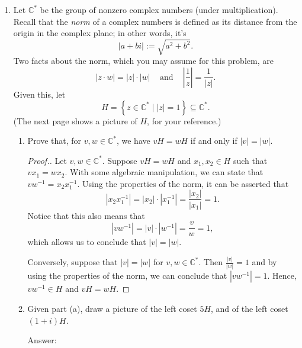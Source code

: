 \documentclass[11pt,twoside]{article}
\begin{document}
\begin{enumerate}
\vspace{0.5cm}
 
 \item Let $\mathbb{C}^*$ be the group of nonzero complex numbers (under multiplication).  Recall that the {\it norm} of a complex numbers is defined as its distance from the origin in the complex plane; in other words, it's
 \[|a+bi| := \sqrt{a^2 + b^2}.\]
 Two facts about the norm, which you may assume for this problem, are
 \[|z \cdot w| = |z| \cdot |w| \;\;\; \text{ and } \;\;\; \left| \frac{1}{z} \right| = \frac{1}{|z|}.\]
 Given this, let
\[H = \left\{z \in \mathbb{C}^* \; \bigg| \; |z| = 1\right\} \subseteq \mathbb{C}^*.\]
(The next page shows a picture of $H$, for your reference.)

\begin{enumerate}

\item Prove that, for $v,w \in \mathbb{C}^*$, we have $vH = wH$ if and only if $|v| = |w|$.

\begin{proof}[\color{red}Proof.] Let $v,w \in \mathbb{C}^*$.  Suppose $vH = wH$ and $x_1,x_2 \in H$ such that $vx_1 = wx_2$.  With some algebraic manipulation, we can state that $vw^{-1} = x_2 x_1^{-1}$.  Using the properties of the norm, it can be asserted that
\[ \left\lvert  x_2 x_1^{-1} \right\rvert = \left\lvert x_2 \right\rvert \cdot \left\lvert x_1^{-1} \right\rvert = \frac{|x_2|}{|x_1|} = 1. \]
Notice that this also means that
\[ \left\lvert  v w^{-1} \right\rvert = \left\lvert v \right\rvert \cdot \left\lvert w^{-1} \right\rvert = \frac{v}{w} = 1, \]
which allows us to conclude that $\left\lvert v \right\rvert = \left\lvert w \right\rvert$.

Conversely, suppose that $\left\lvert v \right\rvert = \left\lvert w \right\rvert$ for $v,w \in \mathbb{C}^*$.  Then $\frac{|v|}{|w|} = 1$ and by using the properties of the norm, we can conclude that $\left\lvert  v w^{-1} \right\rvert = 1$.  Hence, $v w^{-1} \in H$ and $vH = wH$.
\end{proof}

\vspace{0.25cm}

\item Given part (a), draw a picture of the left coset $5H$, and of the left coset $(1+i)H$.

{\color{red}Answer:}
\begin{center}
\end{center}
\end{enumerate}
\end{enumerate}
\end{document}
